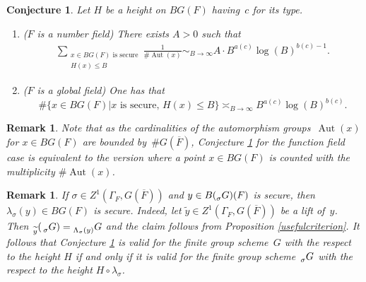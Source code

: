 \documentclass[a4paper,english,12pt]{amsart}
\newcommand{\QQ}{\mathbb{Q}}
\newcommand{\oF}{\overline F}
\newcommand{\sG}{\prescript{}{\sigma}G}
\DeclareMathOperator{\Aut}{Aut}
\newtheorem{conj}[equation]{Conjecture}
\newtheorem{rem}[equation]{Remark}
\numberwithin{equation}{subsection}
\begin{document}
\begin{conj}\label{malletale} %
Let $H$ be a height on $BG(F)$ having~$c$ for its type.
\begin{enumerate}
\item ($F$ is a number field) There exists $A>0$ such that 
\begin{align*}
\sum_{\substack{x\in BG(F)\text{ is secure}\\H(x)\leq B}}\frac{1}{\#\Aut(x)}\sim_{B\to \infty}A\cdot B^{a(c)}\log(B)^{b(c)-1}.
\end{align*}
\item ($F$ is a global field) One has that $$\#\{x\in BG(F)|\text{$x$ is secure, }H(x)\leq B\}\asymp_{B\to \infty} B^{a(c)}\log(B)^{b(c)}.$$
\end{enumerate}
\end{conj}
\begin{rem}
\normalfont
Note that as the cardinalities of the automorphism groups~$\Aut(x)$ for $x\in BG(F)$ are bounded by~$\#G(\oF)$, Conjecture \ref{malletale} for the function field case is equivalent to the version where a point $x\in BG(F)$ is counted with the multiplicity $\#\Aut(x)$.
\end{rem}
\begin{rem}
\normalfont  If $\sigma\in Z^1(\Gamma_F, G(\oF))$ and $y\in B(\sG)(F)$ is secure, then $\lambda_{\sigma}(y)\in BG(F)$ is secure.  Indeed, let $\widetilde {y}\in Z^1(\Gamma_F, G(\oF))$ be a lift of~$y$. Then $\prescript{}{\widetilde y}(\sG)=\prescript{}{\Lambda_{\sigma}(y)}G$ and the claim follows from Proposition \ref{usefulcriterion}. It follows that Conjecture \ref{malletale} is valid for the finite group scheme~$G$ with the respect to the height $H$ if and only if it is valid for the finite group scheme~$\sG$ with the respect to the height $H\circ \lambda_{\sigma}$. 
\end{rem}
\end{document}
